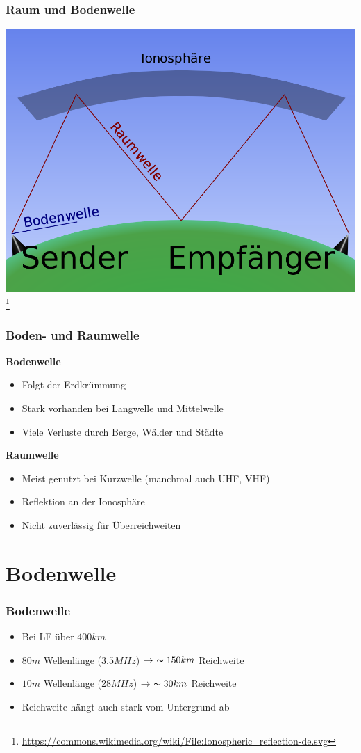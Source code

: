 \begin{frame}
    \frametitle{Raum und Bodenwelle}
	\begin{center}
        \includegraphics[width=1\textwidth,height=.8\textheight,keepaspectratio]{e09/Ionospheric_reflectionpng.png}
         \footnote{\tiny \url{https://commons.wikimedia.org/wiki/File:Ionospheric_reflection-de.svg}}
    \end{center}
\end{frame}

\begin{frame}
    \frametitle{Boden- und Raumwelle}
    \textbf{Bodenwelle}
    \begin{itemize}
	    \item Folgt der Erdkrümmung
	    \item Stark vorhanden bei Langwelle und Mittelwelle
	    \item Viele Verluste durch Berge, Wälder und Städte
    \end{itemize}
    \textbf{Raumwelle}
    \begin{itemize}
	    \item Meist genutzt bei Kurzwelle (manchmal auch UHF, VHF)
	    \item Reflektion an der Ionosphäre 
	    \item Nicht zuverlässig für Überreichweiten
    \end{itemize}
\end{frame}

\section*{Bodenwelle}
\begin{frame}
    \frametitle{Bodenwelle}
    \begin{itemize}
      \item Bei LF über $400km$
      \item $80m$ Wellenlänge ($3.5MHz$) $\rightarrow~\thicksim150km$ Reichweite
      \item $10m$ Wellenlänge ($28MHz$) $\rightarrow~\thicksim30km$ Reichweite
      \item Reichweite hängt auch stark vom Untergrund ab
    \end{itemize}
\end{frame}

